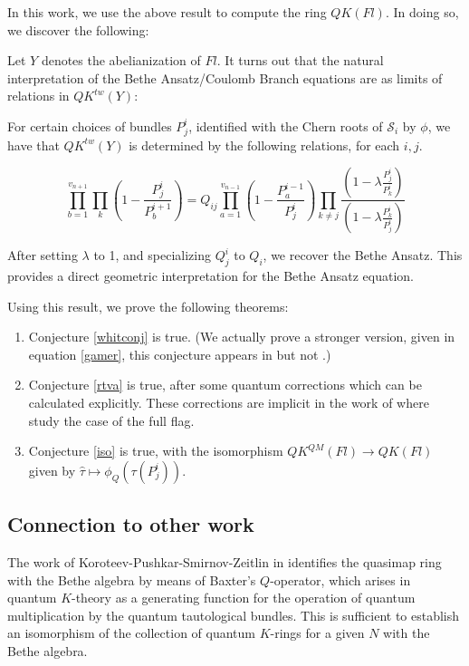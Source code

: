 \documentclass[11pt,letterpaper]{amsart}
\begin{document}
In this work, we use the above result to compute the ring $QK(Fl)$. In doing so, we discover the following: 

Let $Y$ denotes the abelianization of $Fl$. It turns out that the natural interpretation of the Bethe Ansatz/Coulomb Branch equations are as limits of relations in $QK^{tw}(Y):$
\begin{thm}
    
For certain choices of bundles $P^i_j$, identified with the Chern roots of $\mathcal{S}_i$ by $\phi$, we have that $QK^{tw}(Y)$ is determined by the following relations, for each $i,j$. 

$$\prod_{b=1}^{v_{n+1}}\prod_k(1-\frac{P^i_j}{P^{i+1}_b})=Q_{ij}\prod_{a=1}^{v_{n-1}}(1-\frac{P^{i-1}_a}{P^{i}_j})\prod_{k\neq j}\frac{(1-\lambda\frac{P_j^i}{P_k^{i}})}{ (1-\lambda \frac{P^i_k}{P^i_j})}$$

\end{thm}

After setting $\lambda$ to 1, and specializing $Q^i_j$ to $Q_i$, we recover the Bethe Ansatz. This provides a direct geometric interpretation for the Bethe Ansatz equation.

Using this result, we prove the following theorems:



\begin{thm}
\hfill
\begin{enumerate}
    \item Conjecture \ref{whitconj} is true. (We actually prove a stronger version, given in equation \ref{gamer}, this conjecture appears in \cite{conj} but not \cite{incidence}.)
    
    \item Conjecture \ref{rtva} is true, after some quantum corrections which can be calculated explicitly. These corrections are implicit in the work of \cite{manybody} where study the case of the full flag.  


   \item Conjecture \ref{iso} is true, with the isomorphism $QK^{QM}(Fl)\to QK(Fl)$ given by $\widehat{\tau}\mapsto \phi_Q(\tau(P^i_j))$.
\end{enumerate}
\end{thm}


\subsection*{Connection to other work}
 The work of Koroteev-Pushkar-Smirnov-Zeitlin in \cite{manybody} identifies the quasimap ring with the Bethe algebra by means of Baxter's $Q$-operator, which arises in quantum $K$-theory as a generating function for the operation of quantum multiplication by the quantum tautological bundles. This is sufficient to establish an isomorphism of the collection of quantum $K$-rings for a given $N$ with the Bethe algebra. 
\end{document}
